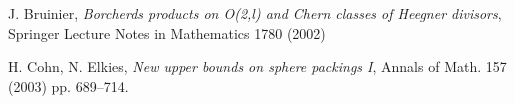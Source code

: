 \begin{thebibliography}{20}


 {\sc J. Bruinier}, \emph{Borcherds products on O(2,l) and Chern classes of Heegner divisors}, Springer Lecture Notes in Mathematics 1780 (2002)

  {\sc H. Cohn, N. Elkies}, \emph{New upper bounds on sphere packings I}, Annals of Math. 157 (2003) pp. 689--714.












\end{thebibliography}
